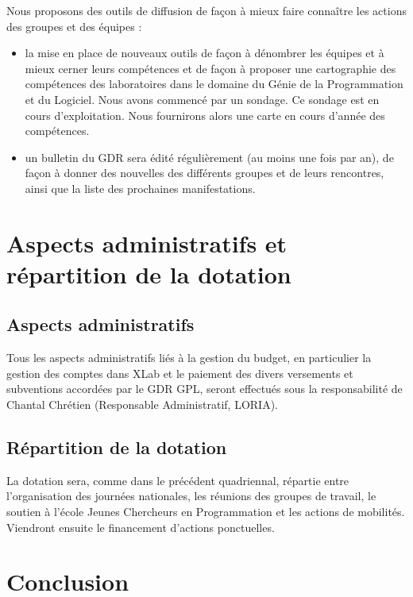 \documentclass[11pt]{article}
\begin{document}
Nous proposons des outils de diffusion de façon à mieux faire connaître les
actions des groupes et des équipes :

\begin{itemize}
\item la mise en place de nouveaux outils de façon à dénombrer les équipes et à mieux cerner leurs compétences et de façon à proposer une cartographie des compétences des laboratoires dans le domaine du Génie de la Programmation et du Logiciel. Nous avons commencé par un sondage. Ce sondage est en cours d'exploitation. Nous fournirons alors une carte en cours d'année des compétences.
\item un bulletin du GDR sera édité régulièrement (au moins une fois par an), de façon à donner des nouvelles des différents groupes et de leurs rencontres, ainsi que la liste des prochaines manifestations.
\end{itemize}




\section{Aspects administratifs et répartition de la dotation}\label{budget}

\subsection{Aspects administratifs}

Tous les aspects administratifs liés à la gestion du budget, en particulier la
gestion des comptes dans XLab et le paiement des divers versements et
subventions accordées par le GDR GPL, seront effectués sous la responsabilité
de Chantal Chrétien (Responsable Administratif, LORIA).  

\subsection{Répartition de la dotation}

La dotation sera, comme dans le précédent quadriennal, répartie entre l'organisation des journées nationales, les réunions des groupes de travail, le soutien à l'école Jeunes Chercheurs en Programmation et les actions de mobilités. Viendront ensuite le financement d'actions ponctuelles.

\section{Conclusion}\label{conclusion}
\end{document}
